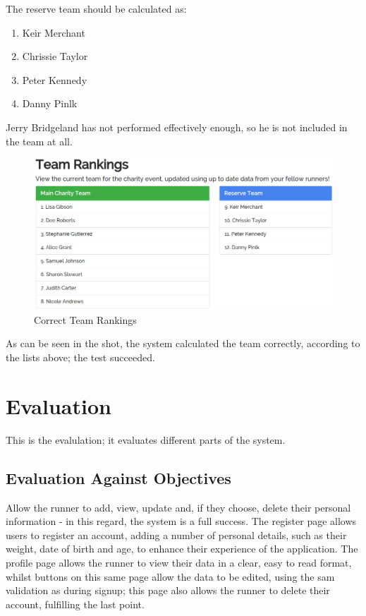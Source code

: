 \documentclass{article}[12pt,a4paper]
\begin{document}
{The reserve team should be calculated as:

\begin{enumerate}
  \item Keir Merchant
  \item Chrissie Taylor
  \item Peter Kennedy
  \item Danny Pinlk\\
\end{enumerate}

Jerry Bridgeland has not performed effectively enough, so he is not included in the team at all.

\begin{figure}[h!]
    \includegraphics[scale=0.35]{images/testing/charity_team/correct_rankings}
    \caption{Correct Team Rankings}
\end{figure}

As can be seen in the shot, the system calculated the team correctly, according to the lists above; the test succeeded.

\clearpage

\section{Evaluation}
This is the evalulation; it evaluates different parts of the system.

\subsection{Evaluation Against Objectives}
Allow the runner to add, view, update and, if they choose, delete their personal information - in this regard, the system is a full success. The register page allows users to register an account, adding a number of personal details, such as their weight, date of birth and age, to enhance their experience of the application. The profile page allows the runner to view their data in a clear, easy to read format, whilst buttons on this same page allow the data to be edited, using the sam validation as during signup; this page also allows the runner to delete their account, fulfilling the last point.

}
\end{document}
